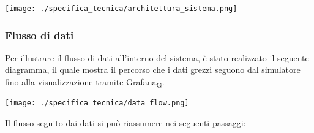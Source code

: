 \begin{center}
	\texttt{[image: ./specifica\_tecnica/architettura\_sistema.png]}
\end{center}

\subsubsection{Flusso di dati}
Per illustrare il flusso di dati all'interno del sistema, è stato realizzato il seguente diagramma, il quale mostra il percorso che i dati grezzi seguono dal simulatore fino alla visualizzazione tramite \href{https://7last.github.io/docs/pb/documentazione-interna/glossario\#grafana}{Grafana\textsubscript{G}}.
\begin{center}
	\texttt{[image: ./specifica\_tecnica/data\_flow.png]}
\end{center}
Il flusso seguito dai dati si può riassumere nei seguenti passaggi:
